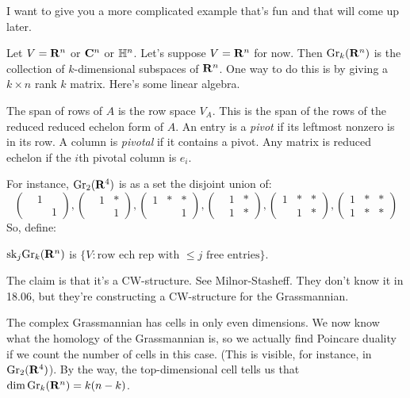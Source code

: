 I want to give you a more complicated example that's fun and that will come up later.
\begin{example}[Grassmannians]
    Let $V=\mathbf R^n$ or $\mathbf C^n$ or $\mathbb H^n$. Let's suppose $V=\mathbf R^n$ for now. Then $\mathrm{Gr}_k(\mathbf R^n)$ is the collection of $k$-dimensional subspaces of $\mathbf R^n$. One way to do this is by giving a $k\times n$ rank $k$ matrix. Here's some linear algebra.

    The span of rows of $A$ is the row space $V_A$. This is the span of the rows of the reduced reduced echelon form of $A$. An entry is a \emph{pivot} if its leftmost nonzero is in its row. A column is \emph{pivotal} if it contains a pivot. Any matrix is reduced echelon if the $i$th pivotal column is $e_i$.

    For instance, $\mathrm{Gr}_2(\mathbf R^4)$ is as a set the disjoint union of:
    \begin{equation*}
	\begin{pmatrix}& 1 & \\ & & 1\end{pmatrix},\begin{pmatrix}&1&\ast\\&&1\end{pmatrix},\begin{pmatrix}1&\ast&\ast\\&&1\end{pmatrix},\begin{pmatrix}&1&\ast\\&1&\ast\end{pmatrix},\begin{pmatrix}1&\ast&\ast\\&1&\ast\end{pmatrix},\begin{pmatrix}1&\ast&\ast\\1&\ast&\ast\end{pmatrix}
    \end{equation*}
    So, define:
    \begin{definition}
	$\mathrm{sk}_j\mathrm{Gr}_k(\mathbf R^n)$ is $\{V:\text{row ech rep with $\leq j$ free entries}\}$.
    \end{definition}
    The claim is that it's a CW-structure. See Milnor-Stasheff. They don't know it in 18.06, but they're constructing a CW-structure for the Grassmannian.
\end{example}
    The complex Grassmannian has cells in only even dimensions. We now know what the homology of the Grassmannian is, so we actually find Poincare duality if we count the number of cells in this case. (This is visible, for instance, in $\mathrm{Gr}_2(\mathbf R^4)$). By the way, the top-dimensional cell tells us that $\dim\mathrm{Gr}_k(\mathbf R^n) = k(n-k)$.
